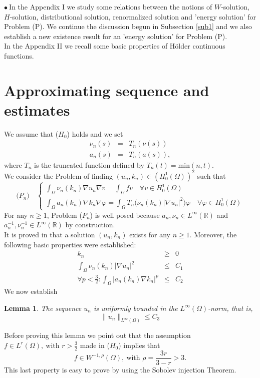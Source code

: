 \documentclass{elsart}
\newtheorem{lemm}[defi]{Lemma}
\begin{document}
$\bullet \ $In the Appendix I we study some relations between the
notions of $W$-solution, $H$-solution,
distributional solution, renormalized solution and 'energy solution'
for Problem (P). We continue the discussion begun in Subsection
\ref{sub1} and we also establish a new existence result for an 'energy
solution' for Problem (P). \\ 
In the Appendix II we recall some basic properties of H\"older continuous functions.    
  

\section{Approximating sequence and estimates} \label{sec1}

We assume that ($H_0$) holds and we set 
\begin{eqnarray}
\nu_n(s) &=& T_n(\nu(s)) \label{1.1} \\ 
a_n(s) &=& T_n(a(s)) \label{1.2},
\end{eqnarray}
where $T_n$ is the truncated function defined by 
$T_n(t)=\text{min}(n,t)$. \\ 
We consider the Problem of finding $(u_n,k_n) \in (H^1_0(\Omega))^2$
such that 
$$
\text{($P_n$)}  \quad\left\{
	\begin{array}{l} 
	\int_{\Omega} \nu_n(k_n)\nabla u_n \nabla v = 
	\int_{\Omega} f v \quad \forall v \in H^1_0(\Omega) \\ 
        \int_{\Omega} a_n(k_n)\nabla k_n \nabla \varphi  =
	\int_{\Omega} T_n\big(\nu_n(k_n)| \nabla u_n|^2 \big) \varphi
	\quad \forall \varphi \in H^1_0(\Omega) 
 	\end{array}
        \right.
$$ 
For any $n\geq 1$, Problem ($P_n$) is well posed because 
$a_n,\nu_n \in L^{\infty}(\mathbb R)$ and $a_n^{-1},\nu_n^{-1} \in
L^{\infty}(\mathbb R)$ by construction. \\ 
It is proved in \cite{gal} that a solution $(u_n,k_n)$ exists for any
$n\geq 1$. Moreover, the following basic properties were established: 
\begin{eqnarray}
k_n &\geq& 0 \label{1.3} \\ 
\int_{\Omega} \nu_n(k_n)|\nabla u_n|^2 &\leq& C_1 \label{1.4} \\ 
\forall p<\frac{3}{2}: \int_{\Omega} \big| a_n(k_n) \nabla k_n \big|^p
&\leq& C_2 \label{1.5} 
\end{eqnarray}
We now establish 
\begin{lemm}\label{lem1}
The sequence $u_n$ is uniformly bounded in the 
$L^{\infty}(\Omega)$-norm, that is, 
\begin{equation} 
\|u_n\|_{L^{\infty}(\Omega)} \leq C_3 \label{1.6}
\end{equation}
\end{lemm}
Before proving this lemma we point out that the assumption 
$f \in L^r(\Omega), \ \text{with } r > \frac{3}{2}$ made in ($H_0$) implies that   
\begin{equation} \label{propf}
f \in W^{-1,\rho}(\Omega), \ \text{with } \rho=\frac{3r}{3-r} > 3.
\end{equation}
This last property is easy to prove by using the Sobolev injection Theorem. 
\end{document}
